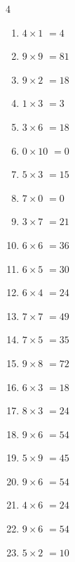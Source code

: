 \begin{multicols}{4}
\begin{enumerate}
\columnbreak %

  \item $4\times 1$
        $=4$

  \item $9\times 9$
        $=81$

  \item $9\times 2$
        $=18$

  \item $1\times 3$
        $=3$

  \item $3\times 6$
        $=18$

  \item $0\times 10$
        $=0$

  \item $5\times 3$
        $=15$

  \item $7\times 0$
        $=0$

  \item $3\times 7$
        $=21$

  \item $6\times 6$
        $=36$

  \item $6\times 5$
        $=30$

  \item $6\times 4$
        $=24$

  \item $7\times 7$
        $=49$

  \item $7\times 5$
        $=35$

  \item $9\times 8$
        $=72$

  \item $6\times 3$
        $=18$

  \item $8\times 3$
        $=24$

  \item $9\times 6$
        $=54$

  \item $5\times 9$
        $=45$

  \item $9\times 6$
        $=54$

  \item $4\times 6$
        $=24$

  \item $9\times 6$
        $=54$

  \item $5\times 2$
        $=10$


\end{enumerate}
\end{multicols}
